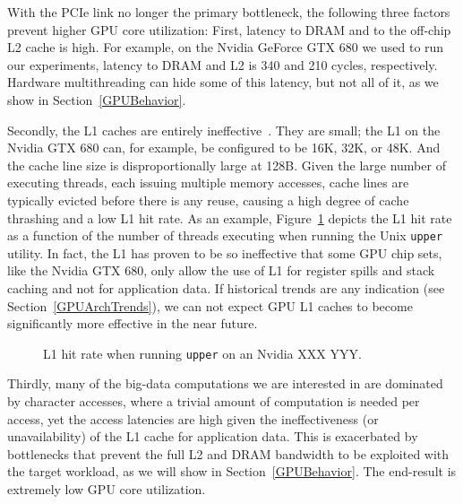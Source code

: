 With the PCIe link no longer the primary bottleneck, the following three factors prevent higher GPU core utilization: 
First, latency to DRAM and to the off-chip L2 cache is high. 
For example, on the Nvidia GeForce GTX 680 we used to run our experiments, latency to DRAM and L2 is 340 and 210 cycles, respectively.
Hardware multithreading can hide some of this latency, but not all of it, as we show in Section~\ref{GPUBehavior}.

Secondly, the L1 caches are entirely ineffective~\cite{??}. 
They are small; the L1 on the Nvidia GTX 680 can, for example, be configured to be 16K, 32K, or 48K.
And the cache line size is disproportionally large at 128B.
Given the large number of executing threads, each issuing multiple memory accesses, cache lines are typically evicted before there is any reuse, causing a high degree of cache thrashing and a low L1 hit rate.
As an example, Figure~\ref{fig:L1HitRate} depicts the L1 hit rate as a function of the number of threads executing when running the Unix \texttt{upper} utility.
In fact, the L1 has proven to be so ineffective that some GPU chip sets, like the Nvidia GTX 680, only allow the use of L1 for register spills and stack caching and not for application data.
If historical trends are any indication (see Section~\ref{GPUArchTrends}), we can not expect GPU L1 caches to become significantly more effective in the near future.

\begin{figure}

\vspace*{4cm}

\caption{L1 hit rate when running \texttt{upper} on an Nvidia XXX YYY.}
\label{fig:L1HitRate}
\end{figure}

Thirdly,  many of the big-data computations we are interested in are dominated by character accesses, where a trivial amount of computation is needed per access, yet the access latencies are high given the ineffectiveness (or unavailability) of the L1 cache for application data.
This is exacerbated by bottlenecks that prevent the full L2 and DRAM bandwidth to be exploited with the target workload, as we will show in Section~\ref{GPUBehavior}.
The end-result is extremely low GPU core utilization.

